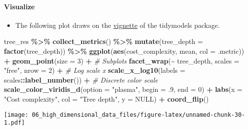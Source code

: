 \documentclass[
]{book}
\newenvironment{Shaded}{\begin{snugshade}}{\end{snugshade}}
\newcommand{\CommentTok}[1]{\textcolor[rgb]{0.56,0.35,0.01}{\textit{#1}}}
\newcommand{\DataTypeTok}[1]{\textcolor[rgb]{0.13,0.29,0.53}{#1}}
\newcommand{\DecValTok}[1]{\textcolor[rgb]{0.00,0.00,0.81}{#1}}
\newcommand{\FloatTok}[1]{\textcolor[rgb]{0.00,0.00,0.81}{#1}}
\newcommand{\KeywordTok}[1]{\textcolor[rgb]{0.13,0.29,0.53}{\textbf{#1}}}
\newcommand{\NormalTok}[1]{#1}
\newcommand{\OperatorTok}[1]{\textcolor[rgb]{0.81,0.36,0.00}{\textbf{#1}}}
\newcommand{\OtherTok}[1]{\textcolor[rgb]{0.56,0.35,0.01}{#1}}
\newcommand{\StringTok}[1]{\textcolor[rgb]{0.31,0.60,0.02}{#1}}
\providecommand{\tightlist}{%
  \setlength{\itemsep}{0pt}\setlength{\parskip}{0pt}}
\begin{document}
\hypertarget{visualize-1}{%
\paragraph{Visualize}\label{visualize-1}}

\begin{itemize}
\tightlist
\item
  The following plot draws on the \href{https://www.tidymodels.org/start/tuning/}{vignette} of the tidymodels package.
\end{itemize}

\begin{Shaded}
\begin{Highlighting}[]
\NormalTok{tree\_res }\OperatorTok{\%\textgreater{}\%}
\StringTok{  }\KeywordTok{collect\_metrics}\NormalTok{() }\OperatorTok{\%\textgreater{}\%}
\StringTok{  }\KeywordTok{mutate}\NormalTok{(}\DataTypeTok{tree\_depth =} \KeywordTok{factor}\NormalTok{(tree\_depth)) }\OperatorTok{\%\textgreater{}\%}
\StringTok{  }\KeywordTok{ggplot}\NormalTok{(}\KeywordTok{aes}\NormalTok{(cost\_complexity, mean, }\DataTypeTok{col =}\NormalTok{ .metric)) }\OperatorTok{+}
\StringTok{  }\KeywordTok{geom\_point}\NormalTok{(}\DataTypeTok{size =} \DecValTok{3}\NormalTok{) }\OperatorTok{+}
\StringTok{  }\CommentTok{\# Subplots }
\StringTok{  }\KeywordTok{facet\_wrap}\NormalTok{(}\OperatorTok{\textasciitilde{}}\StringTok{ }\NormalTok{tree\_depth, }
             \DataTypeTok{scales =} \StringTok{"free"}\NormalTok{, }
             \DataTypeTok{nrow =} \DecValTok{2}\NormalTok{) }\OperatorTok{+}
\StringTok{  }\CommentTok{\# Log scale x }
\StringTok{  }\KeywordTok{scale\_x\_log10}\NormalTok{(}\DataTypeTok{labels =}\NormalTok{ scales}\OperatorTok{::}\KeywordTok{label\_number}\NormalTok{()) }\OperatorTok{+}
\StringTok{  }\CommentTok{\# Discrete color scale }
\StringTok{  }\KeywordTok{scale\_color\_viridis\_d}\NormalTok{(}\DataTypeTok{option =} \StringTok{"plasma"}\NormalTok{, }\DataTypeTok{begin =} \FloatTok{.9}\NormalTok{, }\DataTypeTok{end =} \DecValTok{0}\NormalTok{) }\OperatorTok{+}
\StringTok{  }\KeywordTok{labs}\NormalTok{(}\DataTypeTok{x =} \StringTok{"Cost complexity"}\NormalTok{,}
       \DataTypeTok{col =} \StringTok{"Tree depth"}\NormalTok{,}
       \DataTypeTok{y =} \OtherTok{NULL}\NormalTok{) }\OperatorTok{+}
\StringTok{  }\KeywordTok{coord\_flip}\NormalTok{()}
\end{Highlighting}
\end{Shaded}

\texttt{[image: 06\_high\_dimensional\_data\_files/figure-latex/unnamed-chunk-30-1.pdf]}
\end{document}
